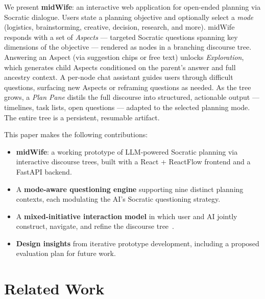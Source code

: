 \documentclass[sigconf]{acmart}
\begin{document}
We present \textbf{midWife}: an interactive
web application for open-ended planning via Socratic dialogue. Users state a planning
objective and optionally select a \textit{mode} (logistics, brainstorming, creative,
decision, research, and more). midWife responds with a set of \textit{Aspects} ---
targeted Socratic questions spanning key dimensions of the objective --- rendered as
nodes in a branching discourse tree. Answering an Aspect (via suggestion chips or
free text) unlocks \textit{Exploration}, which generates child Aspects conditioned
on the parent's answer and full ancestry context. A per-node chat assistant guides
users through difficult questions, surfacing new Aspects or reframing questions as
needed. As the tree grows, a \textit{Plan Pane} distils the full discourse into
structured, actionable output --- timelines, task lists, open questions --- adapted
to the selected planning mode. The entire tree is a persistent, resumable artifact.

This paper makes the following contributions:
\begin{itemize}
  \item \textbf{midWife}: a working prototype of LLM-powered Socratic planning
        via interactive discourse trees, built with a React + ReactFlow frontend
        and a FastAPI backend.
  \item A \textbf{mode-aware questioning engine} supporting nine distinct planning
        contexts, each modulating the AI's Socratic questioning strategy.
  \item A \textbf{mixed-initiative interaction model} in which user and AI jointly
        construct, navigate, and refine the discourse tree~\cite{horvitz1999mixedinitiative}.
  \item \textbf{Design insights} from iterative prototype development, including a
        proposed evaluation plan for future work.
\end{itemize}


\section{Related Work}
\end{document}
